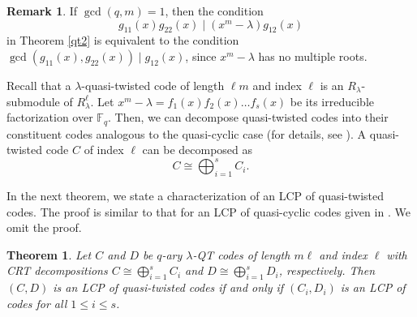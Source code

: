 \documentclass[12 pt]{extarticle}
\numberwithin{equation}{section}
\newtheorem{theorem}{Theorem}[section]
\theoremstyle{definition}
\newtheorem{remark}{Remark}[section]
\begin{document}
\begin{remark} \label{remarkqtgcd}   If $\gcd(q,m)=1$, then the condition 
$$g_{11}(x)g_{22}(x) \mid (x^m-\lambda)g_{12}(x)$$ 
in Theorem \ref{qt2} is equivalent to the condition $\gcd(g_{11}(x),g_{22}(x)) \mid g_{12}(x)$, since $x^m-\lambda$ has no multiple roots.
\end{remark}




Recall that a $\lambda$-quasi-twisted code of length $\ell m$ and index $\ell$ is an $R_\lambda$-submodule of $R_\lambda^\ell$. Let $x^m-\lambda=f_1(x)f_2(x)\dots f_s(x)$ be its irreducible factorization over $\mathbb{F}_q$.  Then, we can decompose quasi-twisted codes into their constituent codes analogous to the quasi-cyclic case (for details, see \cite{jia2012}).  A  quasi-twisted code $C$ of index $\ell$ can be  decomposed as 
\begin{equation*}
C \cong \bigoplus_{i=1}^{s} C_i. 
\end{equation*} 


In the next theorem, we state a characterization of an LCP of quasi-twisted codes. The proof is similar to that for an LCP of quasi-cyclic codes given in \cite{carlet2018}. We omit the proof. 

\begin{theorem} \label{qtclcp} Let $C$ and $D$ be  $q$-ary $\lambda$-QT codes of length $m\ell$ and index $\ell$ with  CRT decompositions  $C \cong \bigoplus_{i=1}^{s} C_i$  and $D \cong \bigoplus_{i=1}^{s} D_i$, respectively.
Then $(C, D)$ is an LCP of quasi-twisted codes  if and only if 
$(C_i, D_i)$ is an LCP of codes for all $1\leq i\leq s$. 
 \end{theorem}
 



\end{document}
